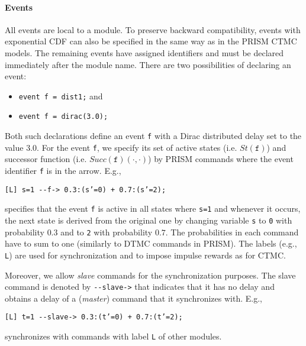 \documentclass{article}
\renewcommand{\_}{\underline{~}}
\newcommand{\suc}{Succ}
\newcommand{\code}[1]{\texttt{#1}}
\begin{document}
\paragraph{Events}
All events are local to a module.
To preserve backward compatibility, events with exponential CDF can also be specified in the same way as in the PRISM CTMC models.
The remaining events have assigned identifiers and must be declared immediately after the module name.
There are two possibilities of declaring an event:
\begin{itemize}
	\item \code{event f = dist1;} and
	\item \code{event f = dirac(3.0);}
\end{itemize}
Both such declarations define an event \code{f} with a Dirac distributed delay set to the value $3.0$.
For the event \code{f}, we specify its set of active states (i.e. $St(\code{f})$) and successor function (i.e. $\suc(\code{f})(\cdot,\cdot)$) by PRISM commands where the event identifier \code{f} is in the arrow. 
E.g., 
\begin{center}
	\code{[L] s=1 {-}{-}f-> 0.3:(s'=0) + 0.7:(s'=2);}
\end{center}
specifies that the event \code{f} is active in all states where \code{s=1} and whenever it occurs, the next state is derived from the original one by changing variable \code{s} to \code{0} with probability $0.3$ and to \code{2} with probability $0.7$. 
The probabilities in each command have to sum to one (similarly to DTMC commands in PRISM). 
The labels (e.g., \code{L}) are used for synchronization and to impose impulse rewards as for CTMC.

Moreover, we allow \emph{slave} commands for the synchronization purposes. 
The slave command is denoted by \code{{-}{-}slave->} that indicates that it has no delay and obtains a delay of a (\emph{master}) command that it synchronizes with.
E.g., 
\begin{center}
	\code{[L] t=1 {-}{-}slave-> 0.3:(t'=0) + 0.7:(t'=2);}
\end{center}
synchronizes with commands with label \code{L} of other modules.

\newpage
\end{document}
